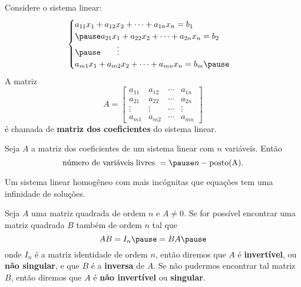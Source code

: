 \documentclass{beamer}
\begin{document}
    \begin{frame}
        Considere o sistema linear:
        \begin{equation*}
            \begin{cases}
                a_{11}x_1 + a_{12}x_2 + \cdots + a_{1n}x_n = b_1\\\pause
                a_{21}x_1 + a_{22}x_2 + \cdots + a_{2n}x_n = b_2\\\pause
                \qquad \vdots\\
                a_{m1}x_1 + a_{m2}x_2 + \cdots + a_{mn}x_n = b_m\pause
            \end{cases}
        \end{equation*}
        A matriz
        \[
        A = \begin{bmatrix}
            a_{11} & a_{12} & \cdots & a_{1n}\\
            a_{21} & a_{22} & \cdots & a_{2n}\\
            \vdots & \vdots & \cdots & \vdots\\
            a_{m1} & a_{m2} & \cdots & a_{mn}
        \end{bmatrix}
        \]
        é chamada de \textbf{matriz dos coeficientes} do sistema linear.
    \end{frame}

    \begin{frame}
        \begin{teorema}
            Seja $A$ a matriz dos coeficientes de um sistema linear \pause com $n$ variáveis. Então\pause
            \[
            \mbox{número de variáveis livres } = \pause n - \p{A}.
            \]
        \end{teorema}
    \end{frame}

    \begin{frame}
        \begin{teorema}
            Um sistema linear homogêneo com mais incógnitas que equações \pause tem uma infinidade de soluções.
        \end{teorema}
    \end{frame}

    \begin{frame}
        \begin{definicao}
            Seja $A$ uma matriz quadrada de ordem $n$ \pause e $A \ne 0$. \pause Se for possível encontrar uma matriz quadrada $B$ \pause também de
            ordem $n$ tal que\pause
            \[
            AB = I_n \pause = BA\pause
            \]
            onde $I_n$ é a matriz identidade de ordem $n$, \pause então diremos que $A$ é \textbf{invertível}, \pause ou \textbf{não singular}, \pause
            e que $B$ é a \textbf{inversa} de $A$. \pause Se não pudermos encontrar tal matriz $B$, \pause então diremos que $A$ é \textbf{não invertível} \pause
            ou \textbf{singular}.
        \end{definicao}
    \end{frame}
\end{document}
